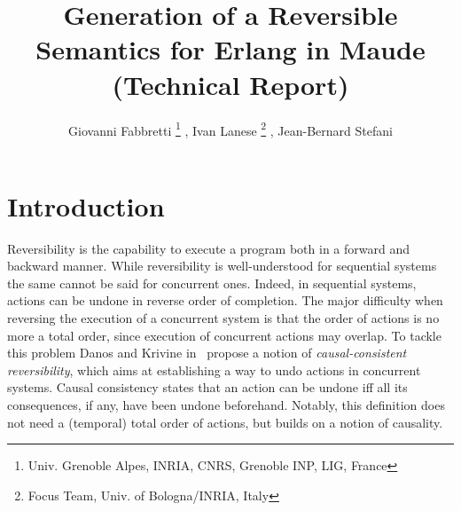 \documentclass{article}[12pt,a4paper]
\theoremstyle{definition}
\newcommand{\footremember}[2]{%
    \footnote{#2}
    \newcounter{#1}
    \setcounter{#1}{\value{footnote}}%
}
\newcommand{\footrecall}[1]{%
    \footnotemark[\value{#1}]%
}
\begin{document}
\title{Generation of a Reversible Semantics for Erlang in Maude (Technical Report)}

\author{Giovanni Fabbretti\footremember{Gre}{Univ. Grenoble Alpes, INRIA, CNRS,
    Grenoble INP, LIG, France}, Ivan Lanese\footremember{Bol}{Focus Team, Univ. of Bologna/INRIA, Italy}, Jean-Bernard Stefani\footrecall{Gre}}
\date{}

\maketitle %


\section{Introduction}


Reversibility is the capability to execute a program both in a forward
and backward manner. While reversibility is well-understood for
sequential systems the same cannot be said for concurrent
ones. Indeed, in sequential systems, actions can be undone in reverse
order of completion.  The major difficulty when reversing the
execution of a concurrent system is that the order of actions is no
more a total order, since execution of concurrent actions may overlap.
To tackle this problem Danos and Krivine in~\cite{DanosK04} propose a
notion of \emph{causal-consistent reversibility}, which aims at
establishing a way to undo actions in concurrent systems. Causal
consistency states that an action can be undone iff all its
consequences, if any, have been undone beforehand. Notably, this
definition does not need a (temporal) total order of actions, but
builds on a notion of causality.
\end{document}
